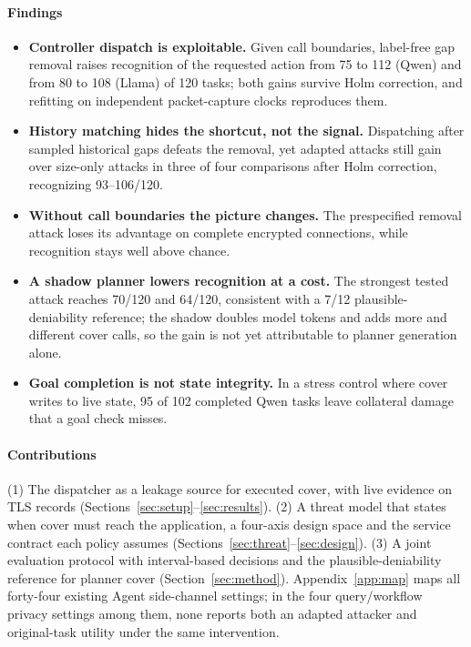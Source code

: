 \paragraph{Findings}
\begin{itemize}
\item \textbf{Controller dispatch is exploitable.} Given call boundaries, label-free gap removal raises recognition of the requested action from 75 to 112 (Qwen) and from 80 to 108 (Llama) of 120 tasks; both gains survive Holm correction, and refitting on independent packet-capture clocks reproduces them.
\item \textbf{History matching hides the shortcut, not the signal.} Dispatching after sampled historical gaps defeats the removal, yet adapted attacks still gain over size-only attacks in three of four comparisons after Holm correction, recognizing 93--106/120.
\item \textbf{Without call boundaries the picture changes.} The prespecified removal attack loses its advantage on complete encrypted connections, while recognition stays well above chance.
\item \textbf{A shadow planner lowers recognition at a cost.} The strongest tested attack reaches 70/120 and 64/120, consistent with a 7/12 plausible-deniability reference; the shadow doubles model tokens and adds more and different cover calls, so the gain is not yet attributable to planner generation alone.
\item \textbf{Goal completion is not state integrity.} In a stress control where cover writes to live state, 95 of 102 completed Qwen tasks leave collateral damage that a goal check misses.
\end{itemize}

\paragraph{Contributions}
(1) The dispatcher as a leakage source for executed cover, with live evidence on TLS records (Sections~\ref{sec:setup}--\ref{sec:results}). (2) A threat model that states when cover must reach the application, a four-axis design space and the service contract each policy assumes (Sections~\ref{sec:threat}--\ref{sec:design}). (3) A joint evaluation protocol with interval-based decisions and the plausible-deniability reference for planner cover (Section~\ref{sec:method}). Appendix~\ref{app:map} maps all forty-four existing Agent side-channel settings; in the four query/workflow privacy settings among them, none reports both an adapted attacker and original-task utility under the same intervention.
